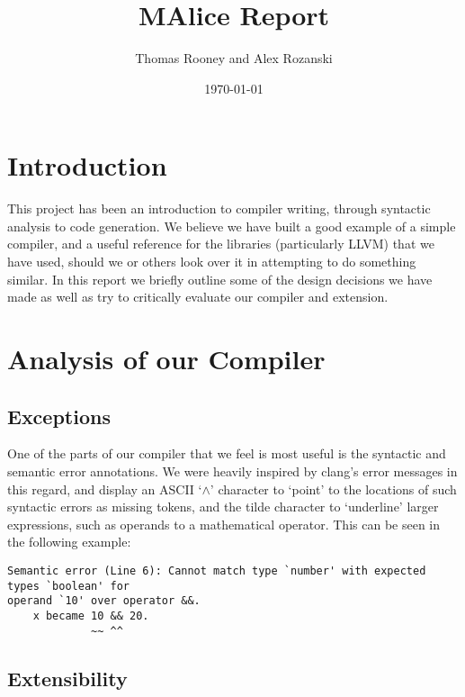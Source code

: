 \documentclass[a4wide, 11pt]{article}
\begin{document}
\title{MAlice Report}

\author{Thomas Rooney and Alex Rozanski}

\date{\today}

\maketitle

\section {Introduction}

This project has been an introduction to compiler writing, through syntactic analysis to code generation. We believe we have built a good example of a simple compiler, and a useful reference for the libraries (particularly LLVM) that we have used, should we or others look over it in attempting to do something similar. In this report we briefly outline some of the design decisions we have made as well as try to critically evaluate our compiler and extension.

\section{Analysis of our Compiler}

\subsection{Exceptions}

One of the parts of our compiler that we feel is most useful is the syntactic and semantic error annotations. We were heavily inspired by clang's error messages in this regard, and display an ASCII `$\wedge$' character to `point' to the locations of such syntactic errors as missing tokens, and the tilde character to `underline' larger expressions, such as operands to a mathematical operator. This can be seen in the following example:

\begin{verbatim}
Semantic error (Line 6): Cannot match type `number' with expected types `boolean' for
operand `10' over operator &&.
    x became 10 && 20.
             ~~ ^^  
\end{verbatim}

\subsection{Extensibility}
\end{document}
